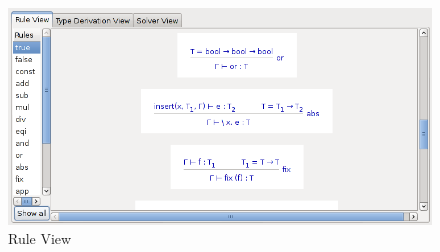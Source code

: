\begin{figure}[t]
\begin{center}
\leavevmode
\includegraphics[width=\textwidth]{Figures/ruleview.png}
\end{center}
\caption{Rule View}
\label{fig:ruleview}
\end{figure}